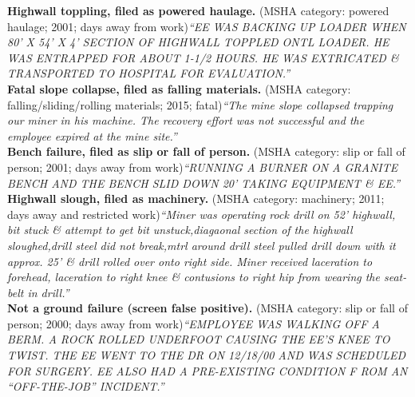 \textbf{Highwall toppling, filed as powered haulage.} (MSHA category: powered haulage; 2001; days away from work)\newline \textit{``EE WAS BACKING UP LOADER WHEN 80' X 54' X 4' SECTION OF HIGHWALL TOPPLED ONTL LOADER. HE WAS ENTRAPPED FOR ABOUT 1-1/2 HOURS. HE WAS EXTRICATED \& TRANSPORTED TO HOSPITAL FOR EVALUATION.''} \\
\midrule
\textbf{Fatal slope collapse, filed as falling materials.} (MSHA category: falling/sliding/rolling materials; 2015; fatal)\newline \textit{``The mine slope collapsed trapping our miner in his machine. The recovery effort was not successful and the employee expired at the mine site.''} \\
\midrule
\textbf{Bench failure, filed as slip or fall of person.} (MSHA category: slip or fall of person; 2001; days away from work)\newline \textit{``RUNNING A BURNER ON A GRANITE BENCH AND THE BENCH SLID DOWN 20' TAKING EQUIPMENT \& EE.''} \\
\midrule
\textbf{Highwall slough, filed as machinery.} (MSHA category: machinery; 2011; days away and restricted work)\newline \textit{``Miner was operating rock drill on 52' highwall, bit stuck \& attempt to get bit unstuck,diagaonal section of the highwall sloughed,drill steel did not break,mtrl around drill steel pulled drill down with it approx. 25' \& drill rolled over onto right side. Miner received laceration to forehead, laceration to right knee \& contusions to right hip from wearing the seat-belt in drill.''} \\
\midrule
\textbf{Not a ground failure (screen false positive).} (MSHA category: slip or fall of person; 2000; days away from work)\newline \textit{``EMPLOYEE WAS WALKING OFF A BERM. A ROCK ROLLED UNDERFOOT CAUSING THE EE'S KNEE TO TWIST. THE EE WENT TO THE DR ON 12/18/00 AND WAS SCHEDULED FOR SURGERY. EE ALSO HAD A PRE-EXISTING CONDITION F ROM AN ``OFF-THE-JOB'' INCIDENT.''} \\
